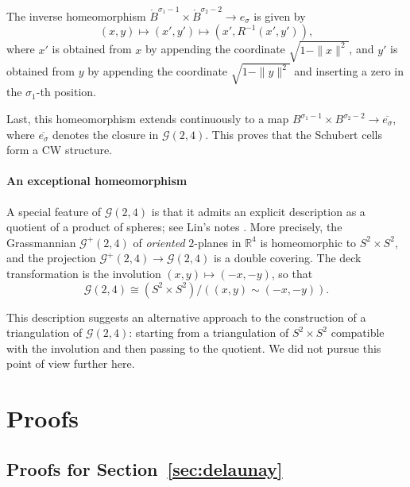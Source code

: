 \documentclass[a4paper,english,cleveref,autoref,thm-restate,nolineno]{socg-lipics-v2021}
\newcommand{\R}{\mathbb R}
\newcommand{\GG}{\mathcal G} %
\begin{document}
The inverse homeomorphism $\mathring{B}^{\sigma_1-1}\times \mathring{B}^{\sigma_2-2}\to e_\sigma$
is given by
\[
(x,y)\mapsto (x',y')\mapsto (x',R^{-1}(x',y')),
\]
where $x'$ is obtained from $x$ by appending the coordinate $\sqrt{1-\|x\|^2}$, and
$y'$ is obtained from $y$ by appending the coordinate $\sqrt{1-\|y\|^2}$ and inserting a zero in the $\sigma_1$-th position.

Last, this homeomorphism extends continuously to a map $B^{\sigma_1-1}\times B^{\sigma_2-2}\to \overline{e_\sigma}$,
where $\overline{e_\sigma}$ denotes the closure in $\GG(2,4)$.
This proves that the Schubert cells form a CW structure.

\paragraph*{An exceptional homeomorphism}

A special feature of $\GG(2,4)$ is that it admits an explicit description as a quotient of a product of spheres; see Lin's notes \cite{Lin_RealGrassmannian}. 
More precisely, the Grassmannian $\GG^+(2,4)$ of \textit{oriented} $2$-planes in $\R^4$ is homeomorphic to $S^2\times S^2$, and the projection $\GG^+(2,4)\to \GG(2,4)$ is a double covering. 
The deck transformation is the involution $(x,y)\mapsto (-x,-y)$, so that
\[
\GG(2,4)\cong (S^2\times S^2)/((x,y) \sim (-x,-y)).
\]

This description suggests an alternative approach to the construction of a triangulation of $\GG(2,4)$: starting from a triangulation of $S^2\times S^2$ compatible with the involution and then passing to the quotient. 
We did not pursue this point of view further here.

\section{Proofs}
\label{sec:proofs}

\subsection{Proofs for Section~\ref*{sec:delaunay}}

\originstereographicprojection*
\end{document}
